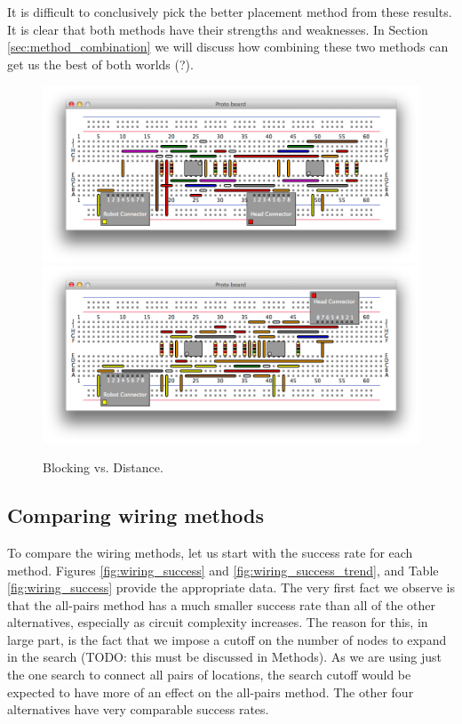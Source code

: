 It is difficult to conclusively pick the better placement method from these results.
It is clear that both methods have their strengths and weaknesses. In Section
\ref{sec:method_combination} we will discuss how combining these two methods can
get us the best of both worlds (?).

\begin{figure}
\begin{center}
\includegraphics[width=\textwidth]{Images/exemplar_per_pair_decreasing.png}
\includegraphics[width=\textwidth]{Images/exemplar_distance.png}
\caption{Blocking vs. Distance.}
\end{center}
\end{figure}

\subsection{Comparing wiring methods}

To compare the wiring methods, let us start with the success rate for each method.
Figures \ref{fig:wiring_success} and \ref{fig:wiring_success_trend}, and Table
\ref{fig:wiring_success} provide the appropriate data. The very first fact we
observe is that the all-pairs method has a much smaller success rate than all of
the other alternatives, especially as circuit complexity increases. The reason
for this, in large part, is the fact that we impose a cutoff on the number of
nodes to expand in the search (TODO: this must be discussed in Methods). As we
are using just the one search to connect all pairs of locations, the search
cutoff would be expected to have more of an effect on the all-pairs method. The
other four alternatives have very comparable success rates.

